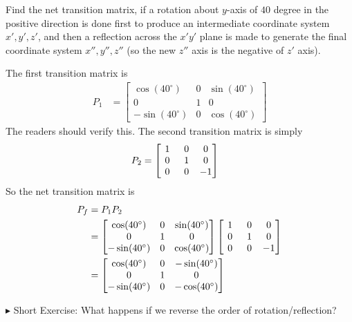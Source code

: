 \begin{exmp}
Find the net transition matrix, if a rotation about $y$-axis of $40$ degree in the positive direction is done first to produce an intermediate coordinate system $x', y', z'$, and then a reflection across the $x'y'$ plane is made to generate the final coordinate system $x'', y'', z''$ (so the new $z''$ axis is the negative of $z'$ axis).
\end{exmp}
\begin{solution}
The first transition matrix is
\begin{align*}
P_1
&= 
\begin{bmatrix}
\cos(40^\circ) & 0 & \sin(40^\circ) \\
0 & 1 & 0 \\
-\sin(40^\circ) & 0 & \cos(40^\circ)
\end{bmatrix}
\end{align*}
The readers should verify this. The second transition matrix is simply
\begin{align*}
P_2
&= 
\left[\begin{array}{@{\,}wc{10pt}wc{10pt}wc{10pt}@{\,}}
1 & 0 & 0 \\
0 & 1 & 0 \\
0 & 0 & -1
\end{array}\right]    
\end{align*}
So the net transition matrix is
\begin{align*}
P_f &= P_1P_2 \\
&= 
\begin{bmatrix}
\cos(40^\circ) & 0 & \sin(40^\circ) \\
0 & 1 & 0 \\
-\sin(40^\circ) & 0 & \cos(40^\circ)
\end{bmatrix}
\left[\begin{array}{@{\,}wc{10pt}wc{10pt}wc{10pt}@{\,}}
1 & 0 & 0 \\
0 & 1 & 0 \\
0 & 0 & -1
\end{array}\right] \\
&= 
\begin{bmatrix}
\cos(40^\circ) & 0 & -\sin(40^\circ) \\
0 & 1 & 0 \\
-\sin(40^\circ) & 0 & -\cos(40^\circ)
\end{bmatrix}
\end{align*}
\end{solution}
$\blacktriangleright$ Short Exercise: What happens if we reverse the order of rotation/reflection?\footnotemark

